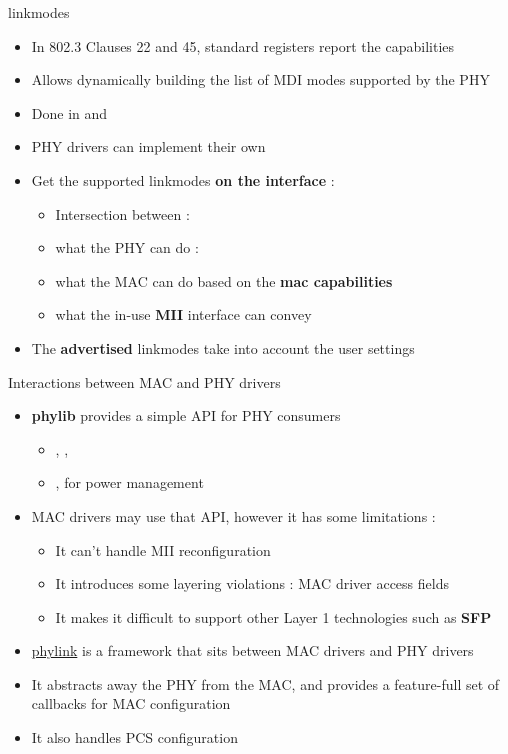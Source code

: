 \begin{frame}{linkmodes}
	\begin{itemize}
		\item In 802.3 Clauses 22 and 45, standard registers report the capabilities
		\item Allows dynamically building the list of MDI modes supported by the PHY
		\item Done in  and 
		\item PHY drivers can implement their own 
		\item Get the supported linkmodes \textbf{on the interface} : 
			\begin{itemize}
				\item Intersection between :
				\item what the PHY can do : 
				\item what the MAC can do based on the \textbf{mac capabilities}
				\item what the in-use \textbf{MII} interface can convey
			\end{itemize}
		\item The \textbf{advertised} linkmodes take into account the user settings
	\end{itemize}
\end{frame}

\begin{frame}{Interactions between MAC and PHY drivers}
	\begin{itemize}
		\item \textbf{phylib} provides a simple API for PHY consumers
			\begin{itemize}
				\item {}, , 
				\item {},  for power management
			\end{itemize}
		\item MAC drivers may use that API, however it has some limitations :
			\begin{itemize}
				\item It can't handle MII reconfiguration
				\item It introduces some layering violations : MAC driver access  fields
				\item It makes it difficult to support other Layer 1 technologies such as \textbf{SFP}
			\end{itemize}
		\item \href{https://elixir.bootlin.com/linux/v6.15.1/source/drivers/net/phy/phylink.c}{phylink} is a framework that sits between MAC drivers and PHY drivers
		\item It abstracts away the PHY from the MAC, and provides a feature-full set of callbacks for MAC configuration
		\item It also handles PCS configuration

	\end{itemize}
\end{frame}

